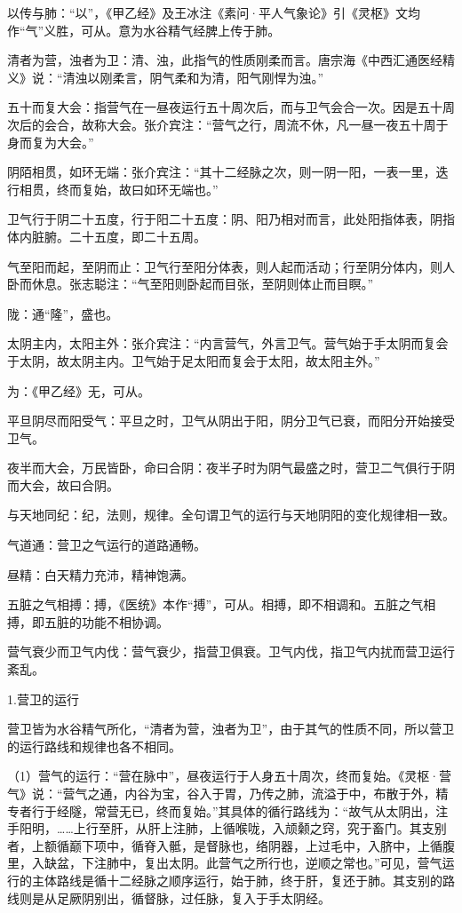\documentclass[12pt]{ctexbook}
\begin{document}
\begin{jiaozhu}
  \item 以传与肺：“以”，《甲乙经》及王冰注《素问·平人气象论》引《灵枢》文均作“气”义胜，可从。意为水谷精气经脾上传于肺。
  \item 清者为营，浊者为卫：清、浊，此指气的性质刚柔而言。唐宗海《中西汇通医经精义》说：“清浊以刚柔言，阴气柔和为清，阳气刚悍为浊。”
  \item 五十而复大会：指营气在一昼夜运行五十周次后，而与卫气会合一次。因是五十周次后的会合，故称大会。张介宾注：“营气之行，周流不休，凡一昼一夜五十周于身而复为大会。”
  \item 阴陌相贯，如环无端：张介宾注：“其十二经脉之次，则一阴一阳，一表一里，迭行相贯，终而复始，故曰如环无端也。”
  \item 卫气行于阴二十五度，行于阳二十五度：阴、阳乃相对而言，此处阳指体表，阴指体内脏腑。二十五度，即二十五周。
  \item 气至阳而起，至阴而止：卫气行至阳分体表，则人起而活动；行至阴分体内，则人卧而休息。张志聪注：“气至阳则卧起而目张，至阴则体止而目瞑。”
  \item 陇：通“隆”，盛也。
  \item 太阴主内，太阳主外：张介宾注：“内言营气，外言卫气。营气始于手太阴而复会于太阴，故太阴主内。卫气始于足太阳而复会于太阳，故太阳主外。”
  \item 为：《甲乙经》无，可从。
  \item 平旦阴尽而阳受气：平旦之时，卫气从阴出于阳，阴分卫气已衰，而阳分开始接受卫气。
  \item 夜半而大会，万民皆卧，命曰合阴：夜半子时为阴气最盛之时，营卫二气俱行于阴而大会，故曰合阴。
  \item 与天地同纪：纪，法则，规律。全句谓卫气的运行与天地阴阳的变化规律相一致。
  \item 气道通：营卫之气运行的道路通畅。
  \item 昼精：白天精力充沛，精神饱满。
  \item 五脏之气相搏：搏，《医统》本作“搏”，可从。相搏，即不相调和。五脏之气相搏，即五脏的功能不相协调。
  \item 营气衰少而卫气内伐：营气衰少，指营卫俱衰。卫气内伐，指卫气内扰而营卫运行紊乱。
\end{jiaozhu}


1.营卫的运行

营卫皆为水谷精气所化，“清者为营，浊者为卫”，由于其气的性质不同，所以营卫的运行路线和规律也各不相同。

（1）营气的运行：“营在脉中”，昼夜运行于人身五十周次，终而复始。《灵枢·营气》说：“营气之通，内谷为宝，谷入于胃，乃传之肺，流溢于中，布散于外，精专者行于经隧，常营无已，终而复始。”其具体的循行路线为：“故气从太阴出，注手阳明，……上行至肝，从肝上注肺，上循喉咙，入颃颡之窍，究于畜门。其支别者，上额循巅下项中，循脊入骶，是督脉也，络阴器，上过毛中，入脐中，上循腹里，入缺盆，下注肺中，复出太阴。此营气之所行也，逆顺之常也。”可见，营气运行的主体路线是循十二经脉之顺序运行，始于肺，终于肝，复还于肺。其支别的路线则是从足厥阴别出，循督脉，过任脉，复入于手太阴经。
\end{document}
